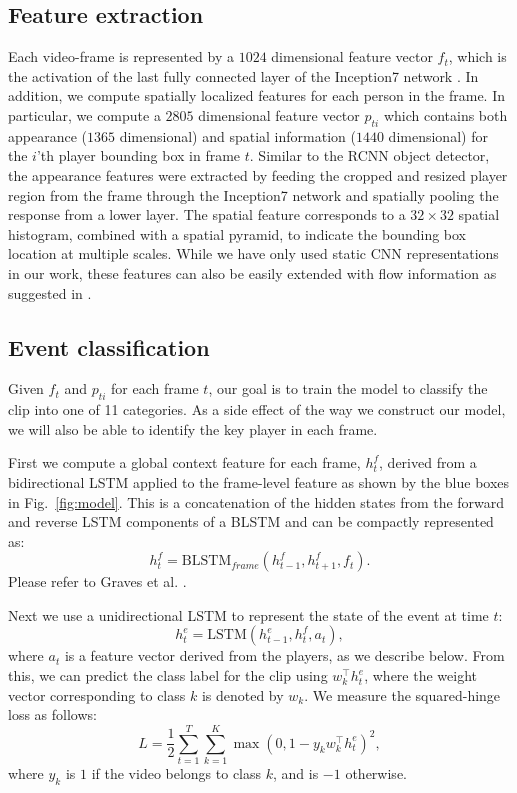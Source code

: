 \subsection{Feature extraction}
\label{sec:feature_extraction}
Each video-frame is represented by a $1024$ dimensional feature vector $f_t$, which is the
activation of the last fully connected layer of the Inception7 network
\cite{Ioffe_arxiv15,Inception7}.  In addition, we compute spatially localized
features for each person in the frame. In particular, we compute a $2805$ dimensional feature
vector $p_{ti}$ which contains both appearance ($1365$ dimensional) and spatial information ($1440$ dimensional) for the
$i$'th player bounding box in frame $t$.
Similar to the RCNN object
detector\cite{Girshick_CVPR14}, the appearance features were extracted by feeding the cropped
and resized player region from the frame through the Inception7 network and
spatially pooling the response from a lower layer. The spatial feature
corresponds to a $32\times 32$ spatial histogram, combined with a spatial pyramid, to
indicate the bounding box location at multiple scales.
While we have only used static CNN representations in our
work, these features can also be easily extended with flow information as
suggested in \cite{Simonyan_NIPS14}.

\subsection{Event classification}

Given $f_t$ and $p_{ti}$ for each frame $t$, our goal
is to train the model to classify the clip into one of 11 categories. As a side
effect of the way we construct our model, we will also be able to identify the
key player in each frame.

First we compute a global context feature for each frame, $h_t^f$, derived from
a bidirectional LSTM applied to the frame-level feature as shown 
by the blue boxes in Fig.~\ref{fig:model}.
This is a concatenation of the hidden states from the forward and reverse LSTM
components of a BLSTM and can be compactly represented as:
\[
  h_t^f = \mbox{BLSTM}_{frame}(h_{t-1}^f, h_{t+1}^f, f_t).
\]Please refer to Graves et al. \cite{Graves_2013}.

Next we use  a unidirectional LSTM to represent the state of the
event at time $t$:
\begin{equation}
  \label{eq:event_lstm}
h_t^e = \mbox{LSTM}(h_{t-1}^e, h_t^f, a_t),
\end{equation}
where $a_t$ is a feature vector derived from the players, as we
describe below.
From this, we can predict the class label for the clip using 
$w_k^\intercal h_t^e$,
where the weight vector corresponding to
class $k$ is denoted by $w_k$.
 We measure the squared-hinge loss as follows:
\begin{equation}
  L =   \frac{1}{2} \sum_{t=1}^T \sum_{k = 1}^K \max (0, 1 - y_k w_k^\intercal h^e_t)^2,
\end{equation} 
where $y_k$ is $1$ if the video belongs to class $k$,
and is $-1$ otherwise.

